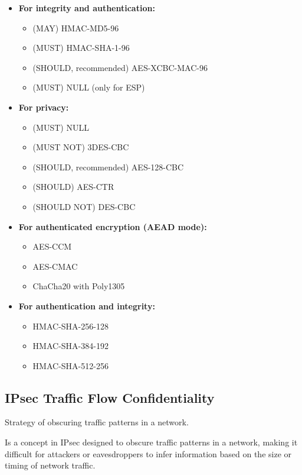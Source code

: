 \begin{itemize}
    \item \textbf{For integrity and authentication:}
    \begin{itemize}
        \item (MAY) HMAC-MD5-96
        \item (MUST) HMAC-SHA-1-96
        \item (SHOULD, recommended) AES-XCBC-MAC-96
        \item (MUST) NULL (only for ESP)
    \end{itemize}
    \item \textbf{For privacy:}
    \begin{itemize}
        \item (MUST) NULL
        \item (MUST NOT) 3DES-CBC
        \item (SHOULD, recommended) AES-128-CBC
        \item (SHOULD) AES-CTR
        \item (SHOULD NOT) DES-CBC
    \end{itemize}
    \item \textbf{For authenticated encryption (AEAD mode):}
    \begin{itemize}
        \item AES-CCM
        \item AES-CMAC
        \item ChaCha20 with Poly1305
    \end{itemize}
    \item \textbf{For authentication and integrity:}
    \begin{itemize}
        \item HMAC-SHA-256-128
        \item HMAC-SHA-384-192
        \item HMAC-SHA-512-256
    \end{itemize}

\end{itemize}

\subsection{IPsec Traffic Flow Confidentiality}
\begin{center}
    Strategy of obscuring traffic patterns in a network.
\end{center}
Is a concept in IPsec designed to obscure traffic patterns in a network, making it difficult for attackers or eavesdroppers to infer information based on the size or timing of network traffic.

